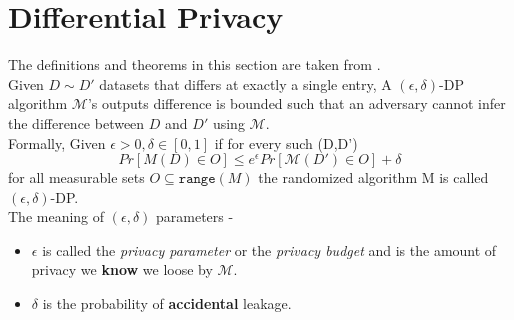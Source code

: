 \section{Differential Privacy}
The definitions and theorems in this section are taken from \cite{Dwork2014ThePrivacy}. \\
Given $D \sim D'$ datasets that differs at exactly a single entry, A $(\epsilon,\delta)$-DP algorithm $\mathcal{M}$'s outputs difference is bounded such that an adversary cannot infer the difference between $D$ and $D'$ using  $\mathcal{M}$. \\
Formally, Given $\epsilon>0, \delta \in [0,1]$ if for every such (D,D')  
$$  Pr[M(D) \in O] \leq e^{\epsilon}Pr[\mathcal{M}(D') \in O]+ \delta$$ for all measurable sets $O \subseteq \texttt{range}(M)$ the randomized algorithm M is called $(\epsilon,\delta)$-DP. \\

The meaning of $(\epsilon, \delta)$ parameters - \\
\begin{itemize}
    \item $\epsilon$ is called the \textit{privacy parameter} or the \textit{privacy budget} and is the amount of privacy we \textbf{know} we loose by $\mathcal{M}$. 
    \item $\delta$ is the probability of \textbf{accidental} leakage.
\end{itemize}


